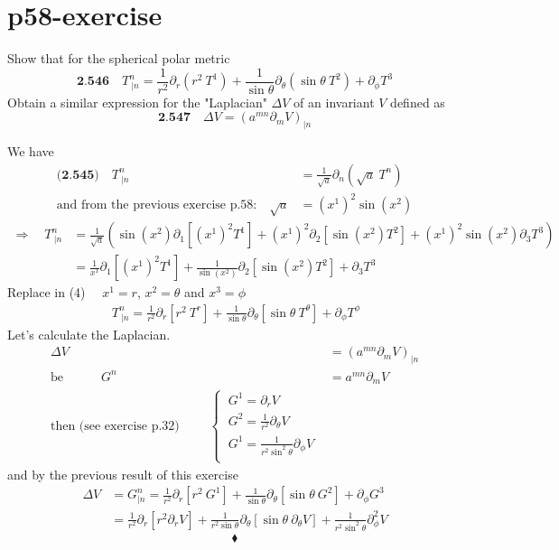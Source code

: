 \section{p58-exercise}
\begin{tcolorbox}
Show that for the spherical polar metric 
$$\textbf{2.546}\quad T^n_{\ |n} = \frac{1}{r^2}\partial_r(r^2 \ T^1) + \frac{1}{\sin \theta }\partial_{\theta}(\sin \theta\  T^2) + \partial_{\phi}T^3 $$
Obtain a similar expression for the "Laplacian" $\Delta V$ of an invariant $V$ defined as $$\textbf{2.547}\quad\Delta V = \left( a^{mn}\partial_m V\right)_{|n}$$
\end{tcolorbox}
We have
\begin{align}
\textbf{(2.545)}\quad T^n_{\ |n} &= \frac{1}{\sqrt{a}}\partial_n(\sqrt{a} \ T^n)\\
\text{and from the previous exercise p.58:}\quad \sqrt{a} &= (x^1)^2\sin(x^2)
\end{align}
\begin{align}
\Rightarrow \quad T^n_{\ |n} &= \frac{1}{\sqrt{a}}\left(\sin(x^2) \partial_1[(x^1)^2 T^1]  + (x^1)^2\partial_2 [ \sin (x^2)T^2] + (x^1)^2 \sin (x^2)\partial_3 T^3 \right)\\
&= \frac{1}{x^1} \partial_1[(x^1)^2 T^1]  + \frac{1}{\sin (x^2)}\partial_2 [ \sin (x^2)T^2] + \partial_3 T^3 
\end{align}
Replace in (4) $\quad x^1 =r$, $x^2 =  \theta$ and $x^3 = \phi$
\begin{align}
\ T^n_{\ |n} = \frac{1}{r^2} \partial_r [r^2 \ T^r]  + \frac{1}{\sin \theta}\partial_{\theta} [ \sin \theta \ T^{\theta}] + \partial_{\phi} T^{\phi} 
\end{align}
Let's calculate the Laplacian.
\begin{align}
\Delta V &= \left( a^{mn}\partial_m V\right)_{|n}\\
\text{be}\quad \quad \quad G^n &= a^{mn}\partial_m V\\
\text{then (see exercise p.32) } \quad \quad \left\{ \begin{array}{c}
\ G^1 = \partial_r V\\
\ G^2 = \frac{1}{r^2}\partial_{\theta} V\\
\ G^1 = \frac{1}{r^2 \sin ^2 \theta}\partial_{\phi} V\\
\end{array}\right.
\end{align}
and by the previous result of this exercise
\begin{align}
\Delta V &= G^n_{|n} = \frac{1}{r^2} \partial_r [r^2 \ G^1]  + \frac{1}{\sin \theta}\partial_{\theta} [ \sin \theta \ G^{2}] + \partial_{\phi} G^{3} \\
\ &= \frac{1}{r^2} \partial_r [r^2 \partial_r V]  + \frac{1}{r^2 \sin \theta}\partial_{\theta} [ \sin \theta \ \partial_{\theta} V] + \frac{1}{r^2 \sin ^2 \theta}\partial^2_{\phi} V
\end{align}
$$\blacklozenge$$
\newpage

